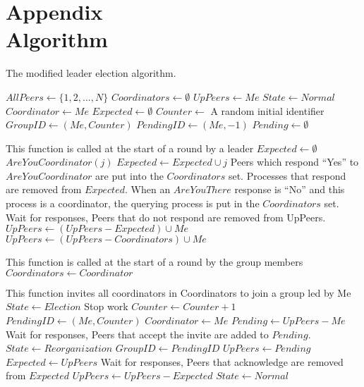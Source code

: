 \chapter[Appendix]{Appendix\\Algorithm}

The modified leader election algorithm.

\begin{algorithmic}[1]
\small
\State $AllPeers \gets \{ 1, 2, ..., N \}$
\State $Coordinators \gets \emptyset$
\State $UpPeers \gets { Me }$
\State $State \gets Normal$
\State $Coordinator \gets Me$
\State $Expected \gets \emptyset$
\State $Counter \gets$ A random initial identifier
\State $GroupID \gets (Me,Counter)$
\State $PendingID \gets (Me, -1)$
\State $Pending \gets \emptyset$

\State

    \State This function is called at the start of a round by a leader
        \Return
    \EndIf
    \State $Expected \gets \emptyset$
        \State $AreYouCoordinator(j)$
        \State $Expected \gets Expected \cup j$
    \EndFor
    \State Peers which respond ``Yes'' to $AreYouCoordinator$ are put into the $Coordinators$ set.
    \State Processes that respond are removed from $Expected$.
    \State When an $AreYouThere$ response is ``No'' and this process is a coordinator, the querying process is put in the $Coordinators$ set.
    \State Wait for responses, Peers that do not respond are removed from UpPeers.
    \State $UpPeers \gets (UpPeers-Expected) \cup {Me}$
    \State $UpPeers \gets (UpPeers-Coordinators) \cup {Me}$
        \Return
    \EndIf
        \State
    \EndIf
\EndFunction

\State

    \State This function is called at the start of a round by the group members
        \Return
    \Else
			\State $Coordinators \gets Coordinator$
        \EndIf
    \EndIf
\EndFunction

\State

    \State This function invites all coordinators in Coordinators to join a group led by Me
    \State $State \gets Election$
    \State Stop work
    \State $Counter \gets Counter+1$
    \State $PendingID \gets (Me,Counter)$
    \State $Coordinator \gets Me$
    \State $Pending \gets UpPeers - {Me}$
    \EndFor
    \State Wait for responses, Peers that accept the invite are added to $Pending$.
    \State $State \gets Reorganization$
	\State $GroupID \gets PendingID$
	\State $UpPeers \gets Pending$
    \EndFor
    \State $Expected \gets UpPeers$
    \State Wait for responses, Peers that acknowledge are removed from $Expected$
    \State $UpPeers \gets UpPeers - Expected$
    \State $State \gets Normal$
\EndFunction


\end{algorithmic}
